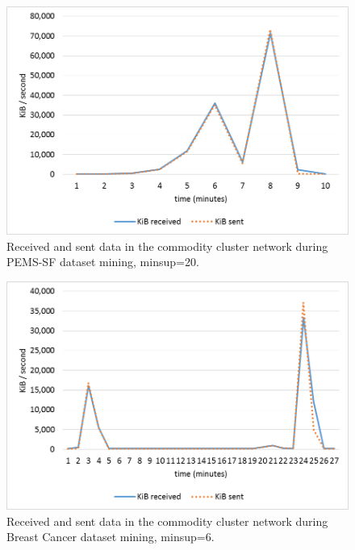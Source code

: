 \begin{figure}[!t]
\includegraphics[width=5in]{chapters/pampa/immagini_extension/comm_cost_pems.png}
\caption{Received and sent data in the commodity cluster network during PEMS-SF dataset mining, minsup=20.}
\label{comm_cost_pems}
\end{figure}

\begin{figure}[!t]
\includegraphics[width=5in]{chapters/pampa/immagini_extension/comm_cost_breast.png}
\caption{Received and sent data in the commodity cluster network during Breast Cancer dataset mining, minsup=6.}
\label{comm_cost_breast}
\end{figure}


